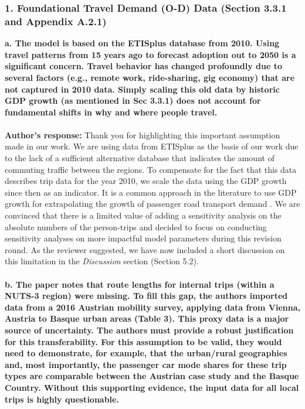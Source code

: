 \documentclass[11pt]{article}
\newcounter{reviewcounter}
\begin{document}
\subsubsection*{1. Foundational Travel Demand (O-D) Data (Section 3.3.1 and Appendix A.2.1)}
\setcounter{reviewcounter}{0} %
\textbf{a. The model is based on the ETISplus database from 2010. Using travel patterns from 15 years ago to forecast adoption out to 2050 is a significant concern. Travel behavior has changed profoundly due to several factors (e.g., remote work, ride-sharing, gig economy) that are not captured in 2010 data. Simply scaling this old data by historic GDP growth (as mentioned in Sec 3.3.1) does not account for fundamental shifts in why and where people travel.}\\\\
\color{authorblue}
\noindent \textcolor{authorblue}{\textbf{Author's response:}}  Thank you for highlighting this important assumption made in our work. We are using data from ETISplus as the basis of our work due to the lack of a sufficient alternative database that indicates the amount of commuting traffic between the regions. To compensate for the fact that this data describes trip data for the year 2010, we scale the data using the GDP growth since then as an indicator. It is a common approach in the literature to use GDP growth for extrapolating the growth of passenger road transport demand \citep{EDELENBOSCH2017281, thomsen2024projecting}. We are convinced that there is a limited value of adding a sensitivity analysis on the absolute numbers of the person-trips and decided to focus on conducting sensitivity analyses on more impactful model parameters during this revision round. 
As the reviewer suggested, we have now included a short discussion on this limitation in the \textit{Discussion} section (Section 5.2). \\ \\
\color{reviewergrey}
\textbf{b. The paper notes that route lengths for internal trips (within a NUTS-3 region) were missing. To fill this gap, the authors imported data from a 2016 Austrian mobility survey, applying data from Vienna, Austria to Basque urban areas (Table 3). This proxy data is a major source of uncertainty. The authors must provide a robust justification for this transferability. For this assumption to be valid, they would need to demonstrate, for example, that the urban/rural geographies and, most importantly, the passenger car mode shares for these trip types are comparable between the Austrian case study and the Basque Country. Without this supporting evidence, the input data for all local trips is highly questionable.} \\\\
\end{document}
